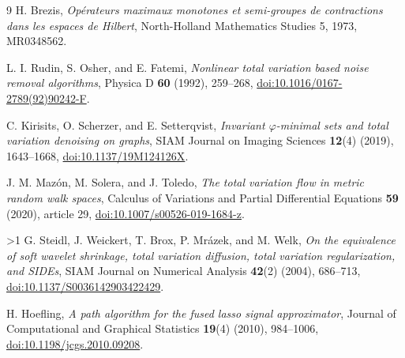 \documentclass[10pt]{article}
\providecommand{\CRevisionRound}{2}
\begin{document}
\begin{thebibliography}{9}
H. Brezis,
\emph{Op\'erateurs maximaux monotones et semi-groupes de contractions dans les
espaces de Hilbert}, North-Holland Mathematics Studies 5, 1973,
MR0348562.

L. I. Rudin, S. Osher, and E. Fatemi,
\emph{Nonlinear total variation based noise removal algorithms},
Physica D \textbf{60} (1992), 259--268,
\href{https://doi.org/10.1016/0167-2789(92)90242-F}
{doi:10.1016/0167-2789(92)90242-F}.

C. Kirisits, O. Scherzer, and E. Setterqvist,
\emph{Invariant $\varphi$-minimal sets and total variation denoising on graphs},
SIAM Journal on Imaging Sciences \textbf{12}(4) (2019), 1643--1668,
\href{https://doi.org/10.1137/19M124126X}{doi:10.1137/19M124126X}.

J. M. Maz\'on, M. Solera, and J. Toledo,
\emph{The total variation flow in metric random walk spaces},
Calculus of Variations and Partial Differential Equations \textbf{59} (2020),
article 29,
\href{https://doi.org/10.1007/s00526-019-1684-z}
{doi:10.1007/s00526-019-1684-z}.

\ifnum\CRevisionRound>1
G. Steidl, J. Weickert, T. Brox, P. Mr\'azek, and M. Welk,
\emph{On the equivalence of soft wavelet shrinkage, total variation
diffusion, total variation regularization, and SIDEs},
SIAM Journal on Numerical Analysis \textbf{42}(2) (2004), 686--713,
\href{https://doi.org/10.1137/S0036142903422429}
{doi:10.1137/S0036142903422429}.

H. Hoefling,
\emph{A path algorithm for the fused lasso signal approximator},
Journal of Computational and Graphical Statistics \textbf{19}(4) (2010),
984--1006,
\href{https://doi.org/10.1198/jcgs.2010.09208}
{doi:10.1198/jcgs.2010.09208}.
\fi
\end{thebibliography}
\end{document}
